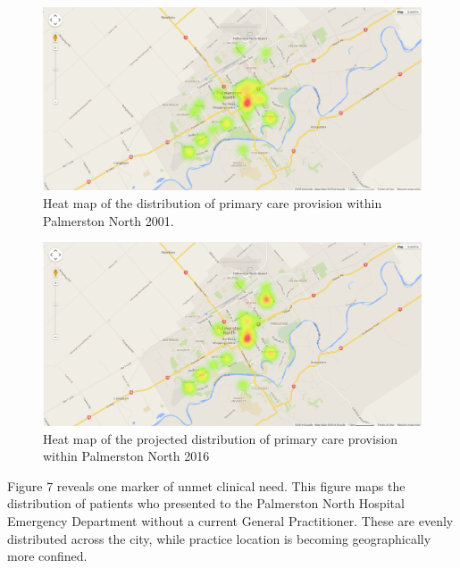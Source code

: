\documentclass[11pt,a4paper]{article}
\begin{document}
\begin{figure}[htp]
\centering
\includegraphics[scale=0.3]{fig6.png}
\caption{Heat map of the distribution of primary care provision within Palmerston North 2001.}
\label{Heat map of practitioners 2001}
\end{figure}  


\begin{figure}[htp]
\centering
\includegraphics[scale=0.30]{fig7.png}
\caption{Heat map of the projected distribution of primary care provision within Palmerston North 2016}
\label{Heat map of the projected distribution of primary care provision within Palmerston North 2016}
\end{figure}

Figure 7 reveals one marker of unmet clinical need. This figure maps the distribution of patients who presented to the Palmerston North Hospital Emergency Department without a current General Practitioner. These are evenly distributed across the city, while practice location is becoming geographically more confined. \\
\end{document}
